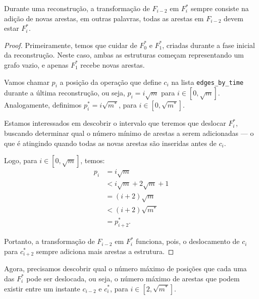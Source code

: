 \begin{theorem}
    \label{teo:adicao-arestas}
    Durante uma reconstrução, a transformação de $F_{i-2}$ em $F_i^*$ sempre consiste na adição de novas arestas, em outras palavras, todas as arestas em $F_{i-2}$ devem estar $F_i^*$.
\end{theorem}
\begin{proof}
    Primeiramente, temos que cuidar de $F_0^*$ e $F_1^*$, criadas durante a fase inicial da reconstrução. Neste caso, ambas as estruturas começam representando um grafo vazio, e apenas $F_1^*$ recebe novas arestas.

    Vamos chamar $p_i$ a posição da operação que define $c_i$ na lista \texttt{edges\_by\_time} durante a última reconstrução, ou seja, $p_i = i \sqrt{m}$ para $i \in [0, \sqrt{m}]$. Analogamente, definimos $p_i^* = i\sqrt{m^*}$, para $i \in [0, \sqrt{m^*}]$.

    Estamos interessados em descobrir o intervalo que teremos que deslocar $F_i^*$, buscando determinar qual o número mínimo de arestas a serem adicionadas --- o que é atingindo quando todas as novas arestas são inseridas antes de $c_i$.

    Logo, para $i \in [0, \sqrt{m}]$, temos:
    \begin{align*}
        p_i & = i \sqrt{m}                 \\
            & < i \sqrt{m} + 2\sqrt{m} + 1 \\
            & = (i+2) \sqrt{m}             \\
            & < (i+2) \sqrt{m^*}           \\
            & = p_{i+2}^*.
    \end{align*}

    Portanto, a transformação de $F_{i-2}$ em $F_i^*$ funciona, pois, o deslocamento de $c_i$ para $c_{i+2}^*$ sempre adiciona mais arestas a estrutura.
\end{proof}

Agora, precisamos descobrir qual o número máximo de posições que cada uma das $F_i^*$ pode ser deslocada, ou seja, o número máximo de arestas que podem existir entre um instante $c_{i-2}$ e $c_i^*$, para $i \in [2,\sqrt{m^*}]$.

